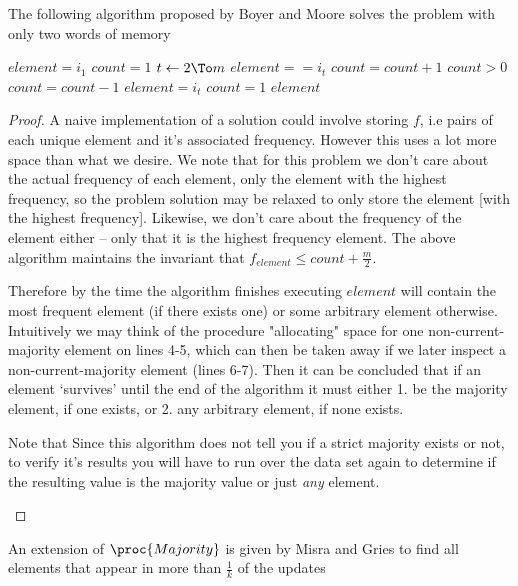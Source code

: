 \documentclass[../notes.tex]{subfiles}
\begin{document}
The following algorithm proposed by Boyer and Moore solves the problem with only two words of memory

\begin{codebox}
\li $ element = i_1 $
\li $ count = 1 $
\li \For $ t \gets 2 \To m $ \Do
\li \If $ element == i_t$ \Then
\li     $count = count + 1 $
\li \ElseIf $ count > 0 $ \Then
\li     $ count = count - 1 $
\li \Else
\li     $ element = i_t $
\li     $ count = 1 $ \End \End
\li \Return $ element $
\end{codebox}

\begin{proof}

    A naive implementation of a solution could involve storing $ f $, i.e pairs of each unique element and it's associated frequency.
    However this uses a lot more space than what we desire. 
    We note that for this problem we don't care about the actual frequency of each element, only the element with the highest frequency, so the problem solution may be relaxed to only store the element [with the highest frequency]. 
    Likewise, we don't care about the frequency of the element either -- only that it is the highest frequency element.
    The above algorithm maintains the invariant that $ f_{element} \le count + \frac{m}{2}$.

    Therefore by the time the algorithm finishes executing $ element $ will contain the most frequent element (if there exists one) or some arbitrary element otherwise.
    Intuitively we may think of the procedure "allocating" space for one non-current-majority element on lines 4-5, which can then be taken away if we later inspect a non-current-majority element (lines 6-7).
    Then it can be concluded that if an element `survives' until the end of the algorithm it must either 1. be the majority element, if one exists, or 2. any arbitrary element, if none exists.

    
    \begin{blockquote}
    Note that Since this algorithm does not tell you if a strict majority exists or not, to verify it's results you will have to run over the data set again to determine if the resulting value is the majority value or just \textit{any} element.
    \end{blockquote}
    
\end{proof}


An extension of $ \proc{Majority} $ is given by Misra and Gries to find all elements that appear in more than $ \frac{1}{k} $ of the updates
\end{document}
